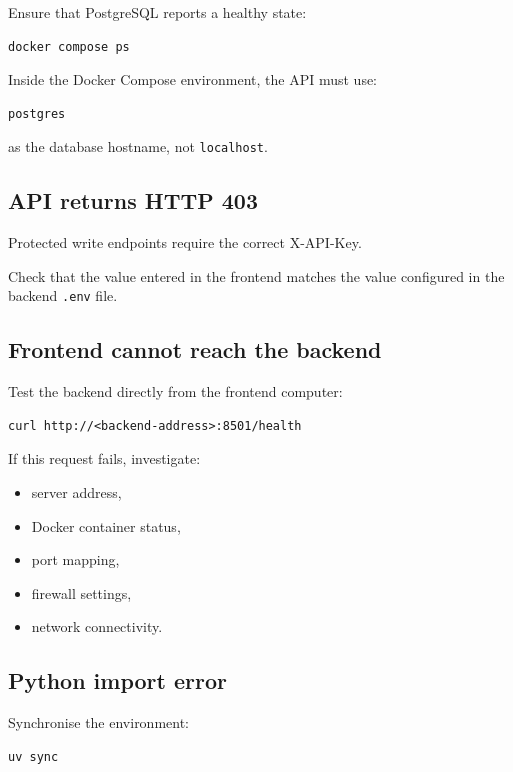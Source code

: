 \documentclass[a4paper,11pt]{article}
\begin{document}
Ensure that PostgreSQL reports a healthy state:

\begin{lstlisting}
docker compose ps
\end{lstlisting}

Inside the Docker Compose environment, the API must use:

\begin{lstlisting}
postgres
\end{lstlisting}

as the database hostname, not \texttt{localhost}.

\subsection{API returns HTTP 403}

Protected write endpoints require the correct X-API-Key.

Check that the value entered in the frontend matches the value configured in
the backend \texttt{.env} file.

\subsection{Frontend cannot reach the backend}

Test the backend directly from the frontend computer:

\begin{lstlisting}
curl http://<backend-address>:8501/health
\end{lstlisting}

If this request fails, investigate:

\begin{itemize}
  \item server address,
  \item Docker container status,
  \item port mapping,
  \item firewall settings,
  \item network connectivity.
\end{itemize}

\subsection{Python import error}

Synchronise the environment:

\begin{lstlisting}
uv sync
\end{lstlisting}
\end{document}

